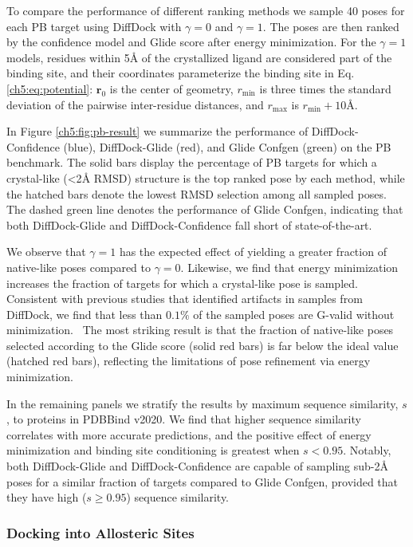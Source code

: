 To compare the performance of different ranking methods we sample 40 poses for each PB target using DiffDock with $\gamma=0$ and $\gamma=1$. The poses are then ranked by the confidence model and Glide score after energy minimization. For the $\gamma=1$ models, residues within 5{\AA} of the crystallized ligand are considered part of the binding site, and their coordinates parameterize the binding site in Eq. \ref{ch5:eq:potential}: $\mathbf{r}_0$ is the center of geometry, $r_\mathrm{min}$ is three times the standard deviation of the pairwise inter-residue distances, and $r_\mathrm{max}$ is $r_\mathrm{min} + 10${\AA}.

In Figure \ref{ch5:fig:pb-result} we summarize the performance of DiffDock-Confidence (blue), DiffDock-Glide (red), and Glide Confgen (green) on the PB benchmark. The solid bars display the percentage of PB targets for which a crystal-like (<2{\AA} RMSD) structure is the top ranked pose by each method, while the hatched bars denote the lowest RMSD selection among all sampled poses. The dashed green line denotes the performance of Glide Confgen, indicating that both DiffDock-Glide and DiffDock-Confidence fall short of state-of-the-art.

We observe that $\gamma=1$ has the expected effect of yielding a greater fraction of native-like poses compared to $\gamma=0$. Likewise, we find that energy minimization increases the fraction of targets for which a crystal-like pose is sampled. Consistent with previous studies that identified artifacts in samples from DiffDock, we find that less than $0.1\%$ of the sampled poses are G-valid without minimization.~\cite{buttenschoen2024posebusters,errington2024plif} The most striking result is that the fraction of native-like poses selected according to the Glide score (solid red bars) is far below the ideal value (hatched red bars), reflecting the limitations of pose refinement via energy minimization.

In the remaining panels we stratify the results by maximum sequence similarity, $s$, to proteins in PDBBind v2020. We find that higher sequence similarity correlates with more accurate predictions, and the positive effect of energy minimization and binding site conditioning is greatest when $s<0.95$. Notably, both DiffDock-Glide and DiffDock-Confidence are capable of sampling sub-2{\AA} poses for a similar fraction of targets compared to Glide Confgen, provided that they have high ($s \geq 0.95$) sequence similarity.

\subsubsection{Docking into Allosteric Sites}

